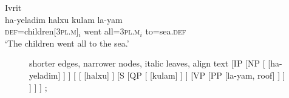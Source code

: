\begin{exe}
\ex \label{ex:hebrqf}
	\langinfo%
		{Ivrit}
		{}
		{\cite[nach][522, 537]{spector2009}}\\
	\gll ha-yeladim halxu kulam la-yam \\
		\textsc{def}=children[\textsc{3pl.m}]$_i$ went all=\textsc{3pl.m}$_i$
			to=sea.\textsc{def} \\
	\trans `The children went all to the sea.'
\end{exe}

\begin{figure}
	\begin{forest} shorter edges, narrower nodes, italic leaves, align text
	[IP
		[NP
			[
				[ha-yeladim]
			]
		]
		[
			[
				[halxu]
			]
			[S%
				[QP
						[
							[kulam]
						]
				]
				[VP%
					[PP
						[la-yam, roof]
					]
				]
			]
		]
	]
	;
	\end{forest}
\end{figure}
